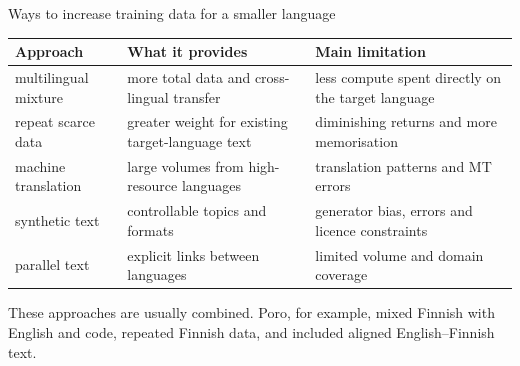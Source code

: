 \documentclass[aspectratio=169,10pt]{beamer}
\begin{document}
\begin{frame}{Ways to increase training data for a smaller language}
  \small
  \centering
  \begin{tabular}{@{}L{2.7cm} L{4.2cm} L{4.2cm}@{}}
    \toprule
    \textbf{Approach} & \textbf{What it provides} & \textbf{Main limitation}\\
    \midrule
    multilingual mixture & more total data and cross-lingual transfer &
      less compute spent directly on the target language\\[0.35em]
    repeat scarce data & greater weight for existing target-language text &
      diminishing returns and more memorisation\\[0.35em]
    machine translation & large volumes from high-resource languages &
      translation patterns and MT errors\\[0.35em]
    synthetic text & controllable topics and formats &
      generator bias, errors and licence constraints\\[0.35em]
    parallel text & explicit links between languages &
      limited volume and domain coverage\\
    \bottomrule
  \end{tabular}

  \vspace{0.6em}
  \raggedright
  These approaches are usually combined. Poro, for example, mixed Finnish with
  English and code, repeated Finnish data, and included aligned
  English--Finnish text.
\end{frame}
\end{document}
